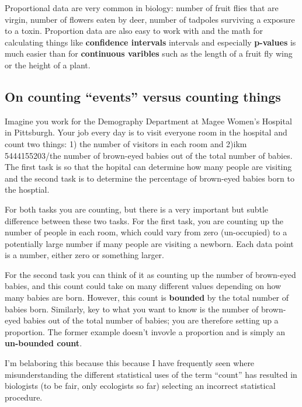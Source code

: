 \documentclass[]{book}
\theoremstyle{definition}
\theoremstyle{definition}
\theoremstyle{definition}
\theoremstyle{remark}
\begin{document}
Proportional data are very common in biology: number of fruit flies that
are virgin, number of flowers eaten by deer, number of tadpoles
surviving a exposure to a toxin. Proportion data are also easy to work
with and the math for calculating things like \textbf{confidence
intervals} intervals and especially \textbf{p-values} is much easier
than for \textbf{continuous varibles} such as the length of a fruit fly
wing or the height of a plant.

\subsection*{\texorpdfstring{On counting ``events'' versus counting
things}{On counting events versus counting things}}\label{on-counting-events-versus-counting-things}

Imagine you work for the Demography Department at Magee Women's Hospital
in Pittsburgh. Your job every day is to visit everyone room in the
hospital and count two things: 1) the number of visitors in each room
and 2)ikm 5444155203/the number of brown-eyed babies out of the total
number of babies. The first task is so that the hopital can determine
how many people are visiting and the second task is to determine the
percentage of brown-eyed babies born to the hosptial.

For both tasks you are counting, but there is a very important but
subtle difference between these two tasks. For the first task, you are
counting up the number of people in each room, which could vary from
zero (un-occupied) to a potentially large number if many people are
visiting a newborn. Each data point is a number, either zero or
something larger.

For the second task you can think of it as counting up the number of
brown-eyed babies, and this count could take on many different values
depending on how many babies are born. However, this count is
\textbf{bounded} by the total number of babies born. Similarly, key to
what you want to know is the number of brown-eyed babies out of the
total number of babies; you are therefore setting up a proportion. The
former example doesn't invovle a proportion and is simply an
\textbf{un-bounded count}.

I'm belaboring this because this because I have frequently seen where
misunderstanding the different statistical uses of the term ``count''
has resulted in biologists (to be fair, only ecologists so far)
selecting an incorrect statistical procedure.
\end{document}
